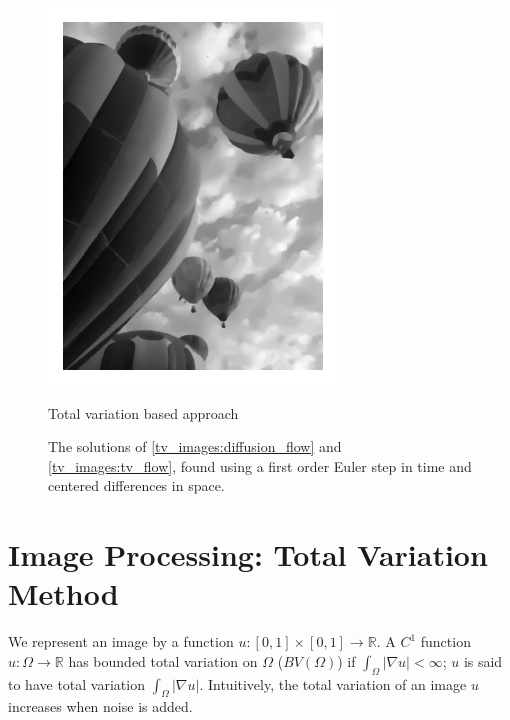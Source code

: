 \begin{figure}
\begin{minipage}[b]{0.47\linewidth}
\includegraphics[width=\textwidth]{figures/balloon_total_variation.pdf}
\caption*{Total variation based approach}
\end{minipage}
\caption{The solutions of \eqref{tv_images:diffusion_flow} and \eqref{tv_images:tv_flow}, found using a first order Euler step in time and centered differences in space.}
\label{fig:noise_compare_attempts}
\end{figure}


\section*{Image Processing: Total Variation Method}
We represent an image by a function $u:[0,1]\times[0,1] \to \mathbb{R}$.
A $C^1$ function $u:\Omega \to \mathbb{R}$ has bounded total variation on $\Omega$ ($BV(\Omega)$) if $\int_{\Omega} |\nabla u| < \infty$; $u$ is said to have total variation $\int_{\Omega} |\nabla u|$.  Intuitively, the total variation of an image $u$ increases when noise is added.

